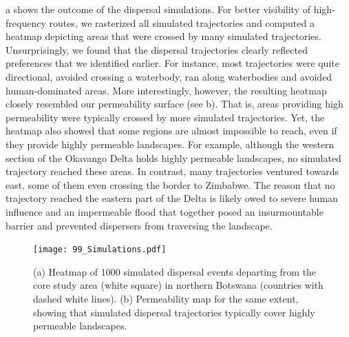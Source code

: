 \documentclass[abstract=on,10pt,a4paper,bibliography=totocnumbered]{scrartcl}
\begin{document}
\newpage
\noindent {}a shows the outcome of the dispersal simulations.
For better visibility of high-frequency routes, we rasterized all simulated
trajectories and computed a heatmap depicting areas that were crossed by many
simulated trajectories. Unsurprisingly, we found that the dispersal trajectories
clearly reflected preferences that we identified earlier. For instance, most
trajectories were quite directional, avoided crossing a waterbody, ran along
waterbodies and avoided human-dominated areas. More interestingly, however, the
resulting heatmap closely resembled our permeability surface (see
b). That is, areas providing high permeability were typically
crossed by more simulated trajectories. Yet, the heatmap also showed that some
regions are almost impossible to reach, even if they provide highly permeable
landscapes. For example, although the western section of the Okavango Delta
holds highly permeable landscapes, no simulated trajectory reached these areas.
In contrast, many trajectories ventured towards east, some of them even crossing
the border to Zimbabwe. The reason that no trajectory reached the eastern part
of the Delta is likely owed to severe human influence and an impermeable flood
that together posed an insurmountable barrier and prevented dispersers from
traversing the landscape.

\begin{figure}[h]
  \begin{center}
    \texttt{[image: 99\_Simulations.pdf]}
    \caption{(a) Heatmap of 1000 simulated dispersal events departing from the
    core study area (white square) in northern Botswana (countries with dashed
    white lines). (b) Permeability map for the same extent, showing that
    simulated dispersal trajectories typically cover highly permeable
    landscapes.}
    \label{Simulations}
  \end{center}
\end{figure}
\end{document}
